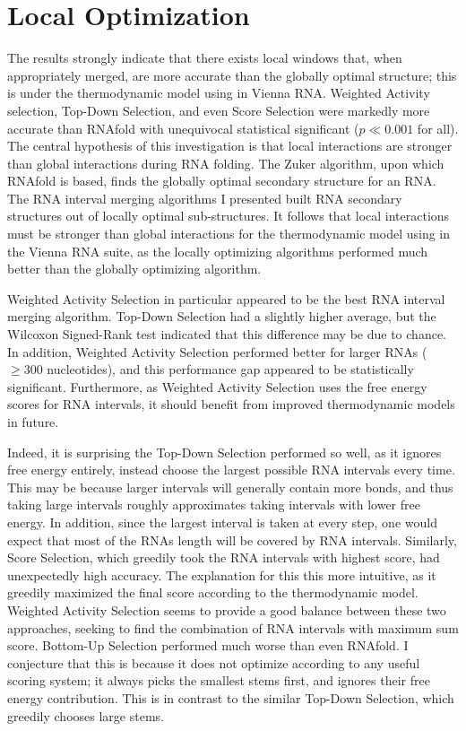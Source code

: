 \documentclass{cshonours}
\begin{document}
\section{Local Optimization}
The results strongly indicate that there exists local windows that, when appropriately merged, are more accurate than the globally optimal structure; this is under the thermodynamic model using in Vienna RNA. Weighted Activity selection, Top-Down Selection, and even Score Selection were markedly more accurate than RNAfold with unequivocal statistical significant ($p \ll 0.001$ for all). The central hypothesis of this investigation is that local interactions are stronger than global interactions during RNA folding. The Zuker algorithm, upon which RNAfold is based, finds the globally optimal secondary structure for an RNA. The RNA interval merging algorithms I presented built RNA secondary structures out of locally optimal sub-structures. It follows that local interactions must be stronger than global interactions for the thermodynamic model using in the Vienna RNA suite, as the locally optimizing algorithms performed much better than the globally optimizing algorithm.

Weighted Activity Selection in particular appeared to be the best RNA interval merging algorithm. Top-Down Selection had a slightly higher average, but the Wilcoxon Signed-Rank test indicated that this difference may be due to chance. In addition, Weighted Activity Selection performed better for larger RNAs ($\geq 300$ nucleotides), and this performance gap appeared to be statistically significant. Furthermore, as Weighted Activity Selection uses the free energy scores for RNA intervals, it should benefit from improved thermodynamic models in future.

Indeed, it is surprising the Top-Down Selection performed so well, as it ignores free energy entirely, instead choose the largest possible RNA intervals every time. This may be because larger intervals will generally contain more bonds, and thus taking large intervals roughly approximates taking intervals with lower free energy. In addition, since the largest interval is taken at every step, one would expect that most of the RNAs length will be covered by RNA intervals. Similarly, Score Selection, which greedily took the RNA intervals with highest score, had unexpectedly high accuracy. The explanation for this this more intuitive, as it greedily maximized the final score according to the thermodynamic model. Weighted Activity Selection seems to provide a good balance between these two approaches, seeking to find the combination of RNA intervals with maximum sum score. Bottom-Up Selection performed much worse than even RNAfold. I conjecture that this is because it does not optimize according to any useful scoring system; it always picks the smallest stems first, and ignores their free energy contribution. This is in contrast to the similar Top-Down Selection, which greedily chooses large stems.
\end{document}
